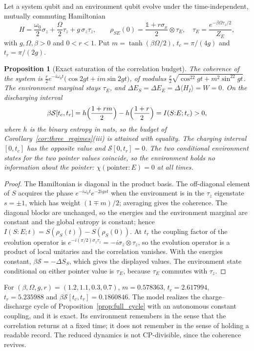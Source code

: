 \documentclass[12pt]{article}
\newtheorem{proposition}[theorem]{Proposition}
\begin{document}
Let a system qubit and an environment qubit evolve under the time-independent, mutually commuting Hamiltonian
\begin{equation}
\label{eq:two_qubit}
H=\frac{\omega_0}2\sigma_z+\frac\Omega2\tau_z+g\,\sigma_z\tau_z,\qquad
\rho_{SE}(0)=\frac{\mathbb 1+r\sigma_x}2\otimes\tau_E,\quad \tau_E=\frac{e^{-\beta\Omega\tau_z/2}}{Z_E},
\end{equation}
with $g,\Omega,\beta>0$ and $0<r<1$. Put $m=\tanh(\beta\Omega/2)$, $t_c=\pi/(4g)$ and $t_r=\pi/(2g)$.

\begin{proposition}[Exact saturation of the correlation budget]
\label{prop:two_qubit}
The coherence of the system is $\tfrac r2e^{-i\omega_0t}\bigl(\cos2gt+im\sin2gt\bigr)$, of modulus $\tfrac r2\sqrt{\cos^22gt+m^2\sin^22gt}$. The environment marginal stays $\tau_E$, and $\Delta E_S=\Delta E_E=\Delta\langle H_I\rangle=W=0$. On the discharging interval
\[
\beta\mathcal S[t_c,t_r]=h\Bigl(\frac{1+rm}2\Bigr)-h\Bigl(\frac{1+r}2\Bigr)=I(S{:}E;t_c)>0,
\]
where $h$ is the binary entropy in nats, so the budget of Corollary~\ref{cor:three_regimes}(iii) is attained with equality. The charging interval $[0,t_c]$ has the opposite value and $\mathcal S[0,t_r]=0$. The two conditional environment states for the two pointer values coincide, so the environment holds no information about the pointer: $\chi(\mathrm{pointer}{:}E)=0$ at all times.
\end{proposition}

\begin{proof}
The Hamiltonian is diagonal in the product basis. The off-diagonal element of $S$ acquires the phase $e^{-i\omega_0t}e^{-2igst}$ when the environment is in the $\tau_z$ eigenstate $s=\pm1$, which has weight $(1\mp m)/2$; averaging gives the coherence. The diagonal blocks are unchanged, so the energies and the environment marginal are constant and the global entropy is constant; hence $I(S{:}E;t)=S(\rho_S(t))-S(\rho_S(0))$. At $t_r$ the coupling factor of the evolution operator is $e^{-i(\pi/2)\sigma_z\tau_z}=-i\sigma_z\otimes\tau_z$, so the evolution operator is a product of local unitaries and the correlation vanishes. With the energies constant, $\beta\mathcal S=-\Delta S_S$, which gives the displayed values. The environment state conditional on either pointer value is $\tau_E$, because $\tau_E$ commutes with $\tau_z$.
\end{proof}

For $(\beta,\Omega,g,r)=(1.2,1.1,0.3,0.7)$, $m=0.578363$, $t_c=2.617994$, $t_r=5.235988$ and $\beta\mathcal S[t_c,t_r]=0.1860846$. The model realizes the charge--discharge cycle of Proposition~\ref{prop:full_cycle} with an autonomous constant coupling, and it is exact. Its environment remembers in the sense that the correlation returns at a fixed time; it does not remember in the sense of holding a readable record. The reduced dynamics is not CP-divisible, since the coherence revives.
\end{document}
